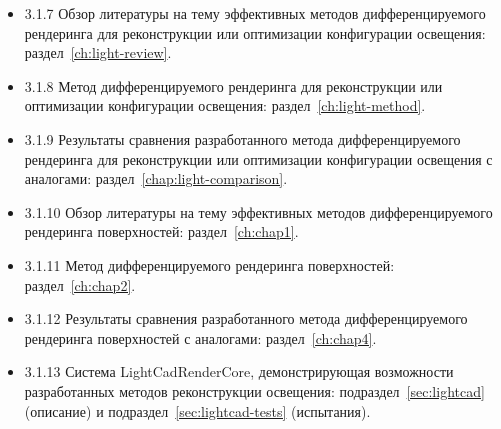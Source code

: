 \begin{itemize}
    \item 3.1.7 Обзор литературы на тему эффективных методов дифференцируемого рендеринга для реконструкции или оптимизации конфигурации освещения: раздел~\ref{ch:light-review}.
    \item 3.1.8 Метод дифференцируемого рендеринга для реконструкции или оптимизации конфигурации освещения: раздел~\ref{ch:light-method}.
    \item 3.1.9 Результаты сравнения разработанного метода дифференцируемого рендеринга для реконструкции или оптимизации конфигурации освещения с аналогами: раздел~\ref{chap:light-comparison}.
    \item 3.1.10 Обзор литературы на тему эффективных методов дифференцируемого рендеринга поверхностей: раздел~\ref{ch:chap1}.
    \item 3.1.11 Метод дифференцируемого рендеринга поверхностей: раздел~\ref{ch:chap2}.
    \item 3.1.12 Результаты сравнения разработанного метода дифференцируемого рендеринга поверхностей с аналогами: раздел~\ref{ch:chap4}.
    \item 3.1.13 Система LightCadRenderCore, демонстрирующая возможности разработанных методов реконструкции освещения: подраздел~\ref{sec:lightcad} (описание) и подраздел~\ref{sec:lightcad-tests} (испытания).
\end{itemize}

\endinput
